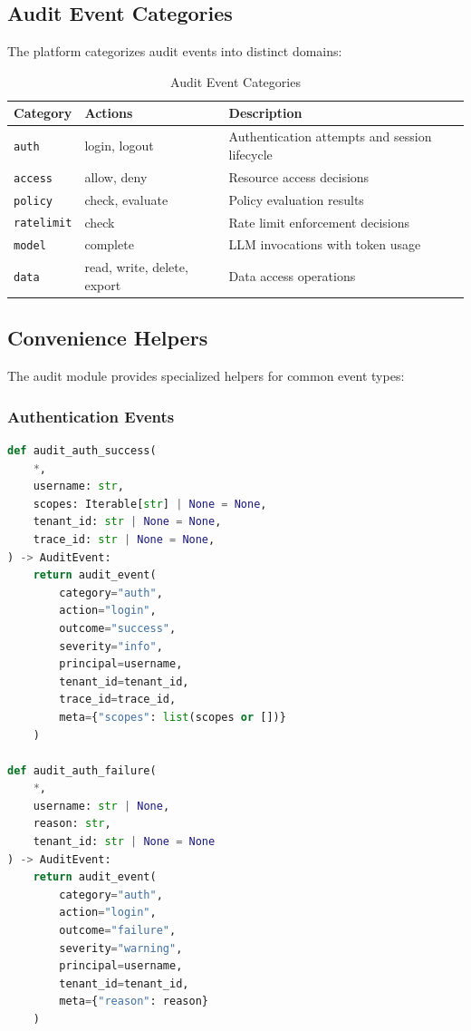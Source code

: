 \subsection{Audit Event Categories}
\label{subsec:audit-categories}

The platform categorizes audit events into distinct domains:

\begin{table}[ht]
\centering
\caption{Audit Event Categories}
\label{tab:audit-categories}
\begin{tabular}{llp{6cm}}
\hline
\textbf{Category} & \textbf{Actions} & \textbf{Description} \\
\hline
\texttt{auth} & login, logout & Authentication attempts and session lifecycle \\
\texttt{access} & allow, deny & Resource access decisions \\
\texttt{policy} & check, evaluate & Policy evaluation results \\
\texttt{ratelimit} & check & Rate limit enforcement decisions \\
\texttt{model} & complete & LLM invocations with token usage \\
\texttt{data} & read, write, delete, export & Data access operations \\
\hline
\end{tabular}
\end{table}

\subsection{Convenience Helpers}
\label{subsec:audit-helpers}

The audit module provides specialized helpers for common event types:

\subsubsection{Authentication Events}

\begin{lstlisting}[language=Python,caption={Authentication audit helpers}]
def audit_auth_success(
    *,
    username: str,
    scopes: Iterable[str] | None = None,
    tenant_id: str | None = None,
    trace_id: str | None = None,
) -> AuditEvent:
    return audit_event(
        category="auth",
        action="login",
        outcome="success",
        severity="info",
        principal=username,
        tenant_id=tenant_id,
        trace_id=trace_id,
        meta={"scopes": list(scopes or [])}
    )

def audit_auth_failure(
    *, 
    username: str | None, 
    reason: str,
    tenant_id: str | None = None
) -> AuditEvent:
    return audit_event(
        category="auth",
        action="login",
        outcome="failure",
        severity="warning",
        principal=username,
        tenant_id=tenant_id,
        meta={"reason": reason}
    )
\end{lstlisting}


